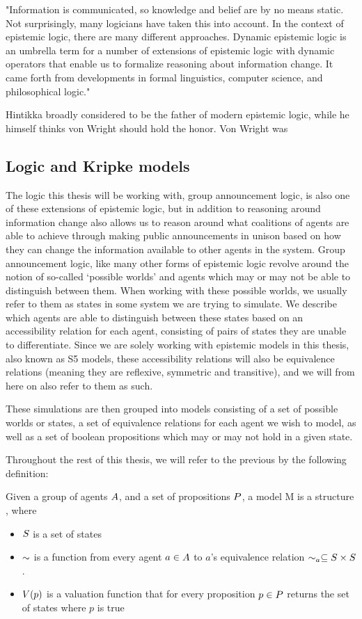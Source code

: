 "Information is communicated, so knowledge and belief are by no means static.
Not surprisingly, many logicians have taken this into account. In the context of
epistemic logic, there are many different approaches. Dynamic epistemic logic
is an umbrella term for a number of extensions of epistemic logic with dynamic
operators that enable us to formalize reasoning about information change. It
came forth from developments in formal linguistics, computer science, and
philosophical logic."\cite{Ditmarsch2007}


Hintikka broadly considered to be the father of modern epistemic logic, while he himself thinks von Wright should hold the honor. Von Wright was 


\subsection{Logic and Kripke models}

The logic this thesis will be working with, group announcement logic, is also one of these extensions of epistemic logic, but in addition to reasoning around information change also allows us to reason around what coalitions of agents are able to achieve through making public announcements in unison based on how they can change the information available to other agents in the system. Group announcement logic, like many other forms of epistemic logic revolve around the notion of so-called `possible worlds' and agents which may or may not be able to distinguish between them. When working with these possible worlds, we usually refer to them as states in some system we are trying to simulate. We describe which agents are able to distinguish between these states based on an accessibility relation for each agent, consisting of pairs of states they are unable to differentiate. Since we are solely working with epistemic models in this thesis, also known as S5 models, these accessibility relations will also be equivalence relations (meaning they are reflexive, symmetric and transitive), and we will from here on also refer to them as such.

These simulations are then grouped into models consisting of a set of possible worlds or states, a set of equivalence relations for each agent we wish to model, as well as a set of boolean propositions which may or may not hold in a given state. 

Throughout the rest of this thesis, we will refer to the previous by the following definition: 
\begin{definition}[Models]\label{def:model}
	Given a group of agents $A$, and a set of propositions $P$, a model M is a structure \model{} , where
	\begin{itemize}
		\item $S$ is a set of states
		\item $\sim$ is a function from every agent $a \in A$ to $a$'s equivalence relation $\sim_a \subseteq S\times S$. 
		\item $V(p)$ is a valuation function that for every proposition $p \in P$ returns the set of states where $p$ is true
	\end{itemize}
\end{definition}

